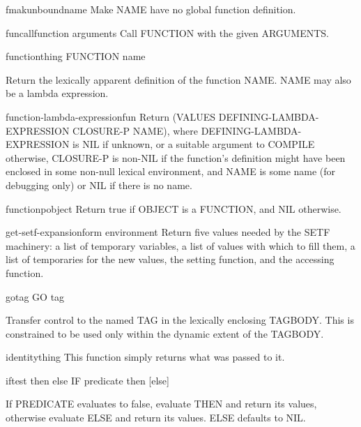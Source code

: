 \begin{function}{fmakunbound}{name}{}
  Make NAME have no global function definition.
\end{function}

\begin{function}{funcall}{function \rest arguments}{}
  Call FUNCTION with the given ARGUMENTS.
\end{function}

\begin{specialop}{function}{thing}{}
  FUNCTION name

Return the lexically apparent definition of the function NAME. NAME may also
be a lambda expression.
\end{specialop}

\begin{function}{function-lambda-expression}{fun}{}
  Return (VALUES DEFINING-LAMBDA-EXPRESSION CLOSURE-P NAME), where
  DEFINING-LAMBDA-EXPRESSION is NIL if unknown, or a suitable argument
  to COMPILE otherwise, CLOSURE-P is non-NIL if the function's definition
  might have been enclosed in some non-null lexical environment, and
  NAME is some name (for debugging only) or NIL if there is no name.
\end{function}

\begin{function}{functionp}{object}{}
  Return true if OBJECT is a FUNCTION, and NIL otherwise.
\end{function}

\begin{function}{get-setf-expansion}{form \op environment}{}
  Return five values needed by the SETF machinery: a list of temporary
   variables, a list of values with which to fill them, a list of temporaries
   for the new values, the setting function, and the accessing function.
\end{function}

\begin{specialop}{go}{tag}{}
  GO tag

Transfer control to the named TAG in the lexically enclosing TAGBODY. This is
constrained to be used only within the dynamic extent of the TAGBODY.
\end{specialop}

\begin{function}{identity}{thing}{}
  This function simply returns what was passed to it.
\end{function}

\begin{specialop}{if}{test then \op else}{}
  IF predicate then [else]

If PREDICATE evaluates to false, evaluate THEN and return its values,
otherwise evaluate ELSE and return its values. ELSE defaults to NIL.
\end{specialop}

